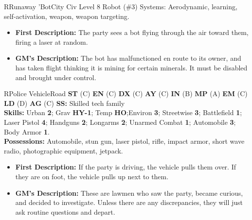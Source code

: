 \hrulefill

\begin{npc}{R}{Runaway 'Bot}{City}
Civ Level 8 Robot (\#3) 
Systems: Aerodynamic, learning, self-activation, weapon, weapon targeting. 
\begin{itemize}
\item \textbf{First Description:} The party sees a bot flying through the air toward them, firing a laser at random. 
\item \textbf{GM's Description:} The bot has malfunctioned en route to its owner, and has taken flight thinking it is mining for certain minerals. It 
must be disabled and brought under control. 
\end{itemize}
\end{npc}

\hrulefill

\begin{npc}{R}{Police Vehicle}{Road}\label{sec:rare-npcs-8}
\textbf{ST} (C) \textbf{EN} (C) \textbf{DX} (C) \textbf{AY} (C) \textbf{IN} (B) \textbf{MP} (A) \textbf{EM} (C) \textbf{LD} (D) \textbf{AG} (C) \textbf{SS:} Skilled tech family \\
\textbf{Skills:} Urban \textbf{2}; Grav \textbf{HY-1}; Temp \textbf{HO};Environ \textbf{3}; Streetwise \textbf{3}; Battlefield \textbf{1}; Laser Pistol \textbf{4}; Handguns \textbf{2}; Longarms \textbf{2}; Unarmed 
Combat \textbf{1}; Automobile \textbf{3}; Body Armor \textbf{1}. \\
\textbf{Possessions:} Automobile, stun gun, laser pistol, rifle, impact armor, short wave radio, photographic equipment, jetpack. 
\begin{itemize}
\item \textbf{First Description:} If the party is driving, the vehicle pulls them over. If they are on foot, the vehicle pulls up next to them. 
\item \textbf{GM's Description:} These are lawmen who saw the party, became curious, and decided to investigate. Unless there are any 
discrepancies, they will just ask routine questions and depart. 
\end{itemize}
\end{npc}

\hrulefill

